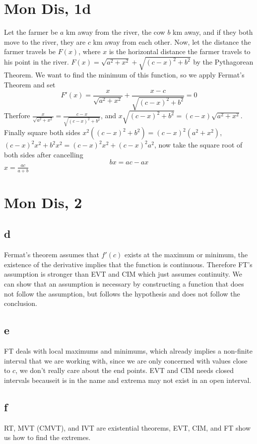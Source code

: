 \documentclass[12pt]{article}
\begin{document}
\section{Mon Dis, 1d}
Let the farmer be $a$ km away from the river, the cow $b$ km away, and if they both move to the river, they are $c$ km away from each other. Now, let the distance the farmer travels be $F(x)$, where $x$ is the horizontal distance the farmer travels to his point in the river. $F(x)= \sqrt{a^2+x^2}+\sqrt{(c-x)^2+b^2}$ by the Pythagorean Theorem.
We want to find the minimum of this function, so we apply Fermat's Theorem and set
$$F'(x)= \frac{x}{\sqrt{a^2+x^2}} + \frac{x-c}{\sqrt{(c-x)^2+b^2}} = 0$$
Therfore $\frac{x}{\sqrt{a^2+x^2}} = \frac{c-x}{\sqrt{(c-x)^2+b^2}}$, and $x\sqrt{(c-x)^2+b^2} = (c-x)\sqrt{a^2+x^2}$. Finally square both sides $x^2((c-x)^2+b^2) = (c-x)^2(a^2+x^2)$, $(c-x)^2x^2+b^2x^2=(c-x)^2x^2+(c-x)^2a^2$, now take the square root of both sides after cancelling
$$bx=ac-ax$$
$x = \frac{ac}{a+b}$

\section{Mon Dis, 2}
\subsection{d}
Fermat's theorem assumes that $f'(c)$ exists at the maximum or minimum, the existence of the derivative implies that the function is continuous. Therefore FT's assumption is stronger than EVT and CIM which just assumes continuity. We can show that an assumption is necessary by constructing a function that does not follow the assumption, but follows the hypothesis and does not follow the conclusion.

\subsection{e}
FT deals with local maximums and minimums, which already implies a non-finite interval that we are working with, since we are only concerned with values close to $c$, we don't really care about the end points. EVT and CIM needs closed intervals becauseit is in the name and extrema may not exist in an open interval.

\subsection{f}
RT, MVT (CMVT), and IVT are existential theorems, EVT, CIM, and FT show us how to find the extremes.
\end{document}

